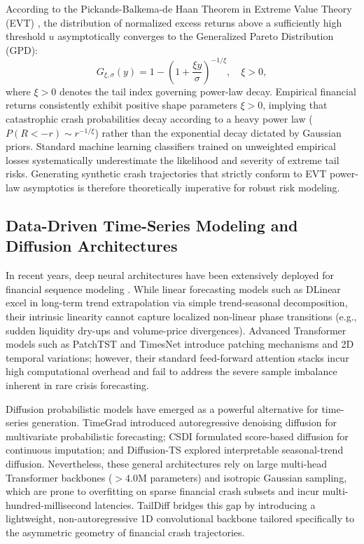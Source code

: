 \documentclass[preprint,12pt,authoryear]{elsarticle}
\begin{document}
According to the Pickands-Balkema-de Haan Theorem in Extreme Value Theory (EVT) \citep{embrechts1997modelling,mcneil2015quantitative}, the distribution of normalized excess returns above a sufficiently high threshold $u$ asymptotically converges to the Generalized Pareto Distribution (GPD):
\begin{equation}
    G_{\xi, \sigma}(y) = 1 - \left(1 + \frac{\xi y}{\sigma}\right)^{-1/\xi}, \quad \xi > 0,
\end{equation}
where $\xi > 0$ denotes the tail index governing power-law decay. Empirical financial returns consistently exhibit positive shape parameters $\xi > 0$, implying that catastrophic crash probabilities decay according to a heavy power law ($P(R < -r) \sim r^{-1/\xi}$) rather than the exponential decay dictated by Gaussian priors. Standard machine learning classifiers trained on unweighted empirical losses systematically underestimate the likelihood and severity of extreme tail risks. Generating synthetic crash trajectories that strictly conform to EVT power-law asymptotics is therefore theoretically imperative for robust risk modeling.

\subsection{Data-Driven Time-Series Modeling and Diffusion Architectures}
In recent years, deep neural architectures have been extensively deployed for financial sequence modeling \citep{gu2020empirical,zhou2021informer}. While linear forecasting models such as DLinear \citep{zeng2024transformers} excel in long-term trend extrapolation via simple trend-seasonal decomposition, their intrinsic linearity cannot capture localized non-linear phase transitions (e.g., sudden liquidity dry-ups and volume-price divergences). Advanced Transformer models such as PatchTST \citep{nie2023patchtst} and TimesNet \citep{wu2022timesnet} introduce patching mechanisms and 2D temporal variations; however, their standard feed-forward attention stacks incur high computational overhead and fail to address the severe sample imbalance inherent in rare crisis forecasting.

Diffusion probabilistic models have emerged as a powerful alternative for time-series generation. TimeGrad \citep{rasul2021autoregressive} introduced autoregressive denoising diffusion for multivariate probabilistic forecasting; CSDI \citep{tashiro2021csdi} formulated score-based diffusion for continuous imputation; and Diffusion-TS \citep{yuan2024diffusion} explored interpretable seasonal-trend diffusion. Nevertheless, these general architectures rely on large multi-head Transformer backbones ($>4.0$M parameters) and isotropic Gaussian sampling, which are prone to overfitting on sparse financial crash subsets and incur multi-hundred-millisecond latencies. TailDiff bridges this gap by introducing a lightweight, non-autoregressive 1D convolutional backbone tailored specifically to the asymmetric geometry of financial crash trajectories.
\end{document}
